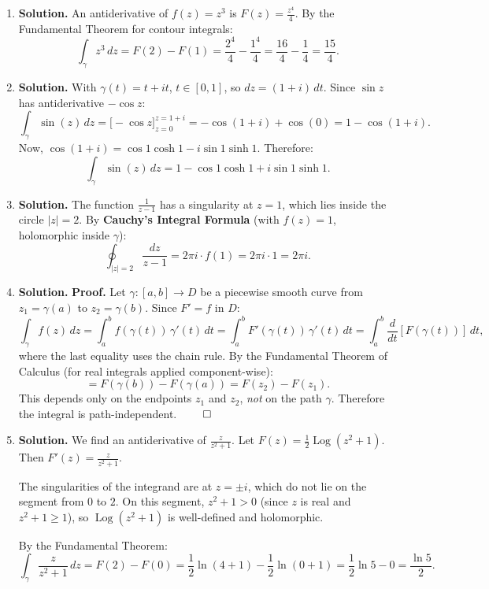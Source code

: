 \begin{enumerate}
\item \textbf{Solution.}
An antiderivative of $f(z) = z^3$ is $F(z) = \frac{z^4}{4}$. By the Fundamental Theorem for contour integrals:
\[
\int_\gamma z^3\,dz = F(2) - F(1) = \frac{2^4}{4} - \frac{1^4}{4} = \frac{16}{4} - \frac{1}{4} = \frac{15}{4}.
\]

\item \textbf{Solution.}
With $\gamma(t) = t + it$, $t \in [0,1]$, so $dz = (1+i)\,dt$. Since $\sin z$ has antiderivative $-\cos z$:
\[
\int_\gamma \sin(z)\,dz = \bigl[-\cos z\bigr]_{z=0}^{z=1+i} = -\cos(1+i) + \cos(0) = 1 - \cos(1+i).
\]
Now, $\cos(1+i) = \cos 1 \cosh 1 - i\sin 1 \sinh 1$. Therefore:
\[
\int_\gamma \sin(z)\,dz = 1 - \cos 1 \cosh 1 + i\sin 1 \sinh 1.
\]

\item \textbf{Solution.}
The function $\frac{1}{z-1}$ has a singularity at $z = 1$, which lies inside the circle $|z| = 2$. By \textbf{Cauchy's Integral Formula} (with $f(z) = 1$, holomorphic inside $\gamma$):
\[
\oint_{|z|=2} \frac{dz}{z-1} = 2\pi i \cdot f(1) = 2\pi i \cdot 1 = 2\pi i.
\]

\item \textbf{Solution.}
\textbf{Proof.} Let $\gamma: [a,b] \to D$ be a piecewise smooth curve from $z_1 = \gamma(a)$ to $z_2 = \gamma(b)$. Since $F' = f$ in $D$:
\[
\int_\gamma f(z)\,dz = \int_a^b f(\gamma(t))\,\gamma'(t)\,dt = \int_a^b F'(\gamma(t))\,\gamma'(t)\,dt = \int_a^b \frac{d}{dt}[F(\gamma(t))]\,dt,
\]
where the last equality uses the chain rule. By the Fundamental Theorem of Calculus (for real integrals applied component-wise):
\[
= F(\gamma(b)) - F(\gamma(a)) = F(z_2) - F(z_1).
\]
This depends only on the endpoints $z_1$ and $z_2$, \emph{not} on the path $\gamma$. Therefore the integral is path-independent. $\qed$

\item \textbf{Solution.}
We find an antiderivative of $\frac{z}{z^2+1}$. Let $F(z) = \frac{1}{2}\operatorname{Log}(z^2 + 1)$. Then $F'(z) = \frac{z}{z^2 + 1}$.

The singularities of the integrand are at $z = \pm i$, which do not lie on the segment from $0$ to $2$. On this segment, $z^2 + 1 > 0$ (since $z$ is real and $z^2 + 1 \geq 1$), so $\operatorname{Log}(z^2+1)$ is well-defined and holomorphic.

By the Fundamental Theorem:
\[
\int_\gamma \frac{z}{z^2+1}\,dz = F(2) - F(0) = \frac{1}{2}\ln(4+1) - \frac{1}{2}\ln(0+1) = \frac{1}{2}\ln 5 - 0 = \frac{\ln 5}{2}.
\]


\end{enumerate}
